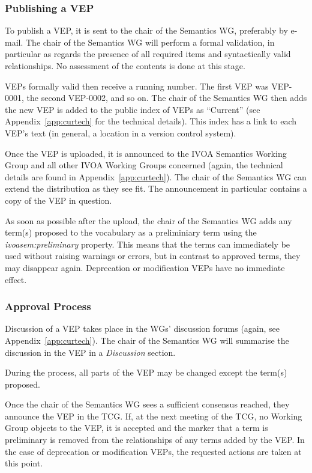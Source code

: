 \documentclass[11pt,a4paper]{ivoa}
\newcommand{\vocterm}[1]{\emph{\color{termcolor}#1}}
\begin{document}
\subsubsection{Publishing a VEP}

To publish a VEP, it is sent to the chair of the Semantics WG,
preferably by e-mail.  The chair of the Semantics WG will perform a
formal validation, in particular as regards the presence of all required
items and syntactically valid relationships.  No assessment of the
contents is done at this stage.

VEPs formally valid then receive a running number. The first VEP was
VEP-0001, the second VEP-0002, and so on.  The chair of the Semantics WG
then adds the new VEP is added to the public index of VEPs as
``Current'' (see Appendix~\ref{app:curtech} for the technical details).
This index has a link to each VEP's text (in general, a location in a
version control system).

Once the VEP is uploaded, it is announced to the IVOA Semantics Working
Group and all other IVOA Working Groups concerned (again, the technical
details are found in Appendix~\ref{app:curtech}).  The chair of the
Semantics WG can extend the distribution as they see fit.  The
announcement in particular contains a copy of the VEP in question.

As soon as possible after the upload, the chair of the Semantics WG adds
any term(s) proposed to the vocabulary as a preliminiary term using the
\vocterm{ivoasem:preliminary} property.   This means that the terms can
immediately be used without raising warnings or errors, but in contrast
to approved terms, they may disappear again.  Deprecation or
modification VEPs have no immediate effect.

\subsubsection{Approval Process}
\label{sect:approval}

Discussion of a VEP takes place in the WGs' discussion forums (again,
see Appendix~\ref{app:curtech}).  The chair of the Semantics WG will
summarise the discussion in the VEP in a \textit{Discussion} section.

During the process, all parts of the VEP may be changed except the
term(s) proposed.

Once the chair of the Semantics WG sees a sufficient consensus reached,
they announce the VEP in the TCG.  If, at the next meeting of the TCG,
no Working Group objects to the VEP, it is accepted and the marker that
a term is preliminary is removed from the relationships of any terms
added by the VEP.  In the case of deprecation or modification VEPs, the
requested actions are taken at this point.
\end{document}
